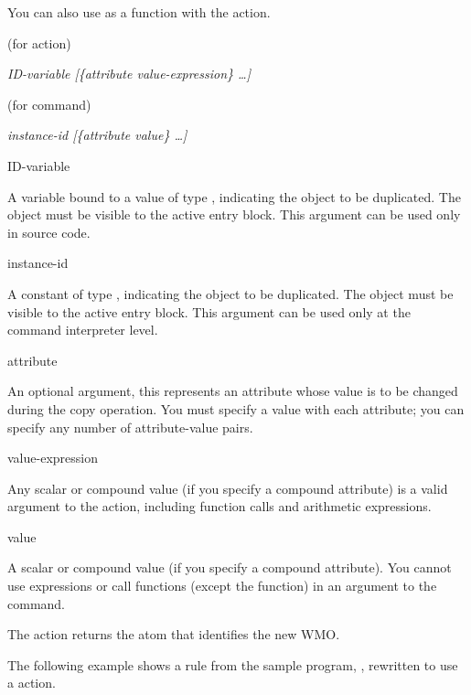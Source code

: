 You can also use  as a function with the  action.

\Format (for action)

 \it{ID-variable} [\{\ct\it{attribute} \it{value-expression}\} \ldots]

\Format (for command)

 \it{instance-id} [\{\ct\it{attribute} \it{value}\} \ldots]

\begin{arguments}
\item[ID-variable]

  A variable bound to a value of type , indicating the
  object to be duplicated. The object must be visible to the active
  entry block. This argument can be used only in source code.

\item[instance-id]

  A constant of type , indicating the object to be
  duplicated. The object must be visible to the active entry
  block. This argument can be used only at the command interpreter
  level.

\item[attribute]

  An optional argument, this represents an attribute whose value is to
  be changed during the copy operation. You must specify a value with
  each attribute; you can specify any number of attribute-value pairs.

\item[value-expression]

  Any scalar or compound value (if you specify a compound attribute)
  is a valid argument to the  action, including function
  calls and arithmetic expressions.

\item[value]

  A scalar or compound value (if you specify a compound
  attribute). You cannot use expressions or call functions (except the
   function) in an argument to the  command.
\end{arguments}

\ReturnValue

The  action returns the  atom that identifies
the new WMO.

\Example

The following example shows a rule from the sample program,
, rewritten to use a  action.


